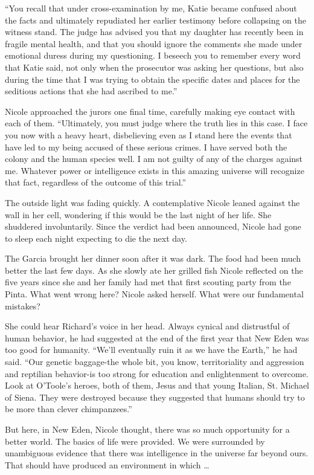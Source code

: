 \documentclass[]{article}
\begin{document}
{{“You recall that under cross-examination by me, Katie became confused about the facts and ultimately repudiated her earlier testimony before collapsing on the witness stand.  The judge has advised you that my daughter has recently been in fragile mental health, and that you should ignore the comments she made under emotional duress during my questioning.  I beseech you to remember every word that Katie said, not only when the prosecutor was asking her questions, but also during the time that I was trying to obtain the specific dates and places for the seditious actions that she had ascribed to me.”

Nicole approached the jurors one final time, carefully making eye contact with each of them.  “Ultimately, you must judge where the truth lies in this case.  I face you now with a heavy heart, disbelieving even as I stand here the events that have led to my being accused of these serious crimes.  I have served both the colony and the human species well.  I am not guilty of any of the charges against me.  Whatever power or intelligence exists in this amazing universe will recognize that fact, regardless of the outcome of this trial.”

The outside light was fading quickly.  A contemplative Nicole leaned against the wall in her cell, wondering if this would be the last night of her life.  She shuddered involuntarily.  Since the verdict had been announced, Nicole had gone to sleep each night expecting to die the next day.

The Garcia brought her dinner soon after it was dark.  The food had been much better the last few days.  As she slowly ate her grilled fish Nicole reflected on the five years since she and her family had met that first scouting party from the Pinta.  What went wrong here? Nicole asked herself.  What were our fundamental mistakes?

She could hear Richard’s voice in her head.  Always cynical and distrustful of human behavior, he had suggested at the end of the first year that New Eden was too good for humanity.  “We’ll eventually ruin it as we have the Earth,” he had said.  “Our genetic baggage-the whole bit, you know, territoriality and aggression and reptilian behavior-is too strong for education and enlightenment to overcome.  Look at O’Toole’s heroes, both of them, Jesus and that young Italian, St.  Michael of Siena.  They were destroyed because they suggested that humans should try to be more than clever chimpanzees.”

But here, in New Eden, Nicole thought, there was so much opportunity for a better world.  The basics of life were provided.  We were surrounded by unambiguous evidence that there was intelligence in the universe far beyond ours.  That should have produced an environment in which …

}}
\end{document}
